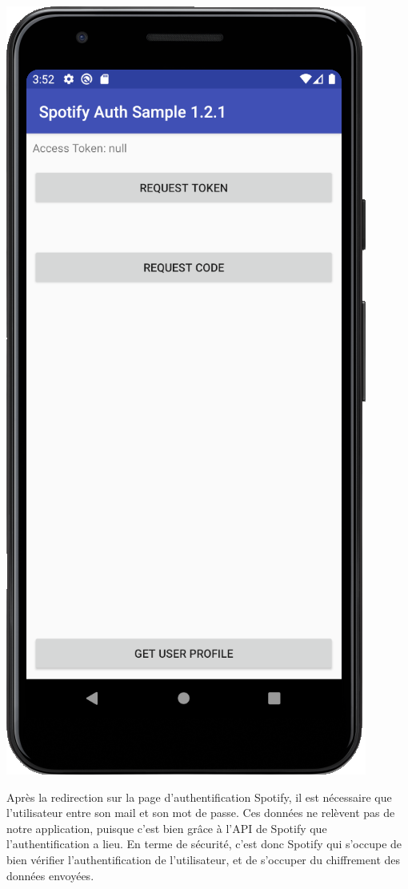 \documentclass[12pt, openany]{report}
\begin{document}
    \includegraphics[scale=0.5]{images/recupinfos.png}
    
    \newpage
    
    Après la redirection sur la page d'authentification Spotify, il est nécessaire que l'utilisateur entre son mail et son mot de passe. Ces données ne relèvent pas de notre application, puisque c'est bien grâce à l'API de Spotify que l'authentification a lieu. En terme de sécurité, c'est donc Spotify qui s'occupe de bien vérifier l'authentification de l'utilisateur, et de s'occuper du chiffrement des données envoyées. \cite{Auth}
    \\
    \\
    
\end{document}
